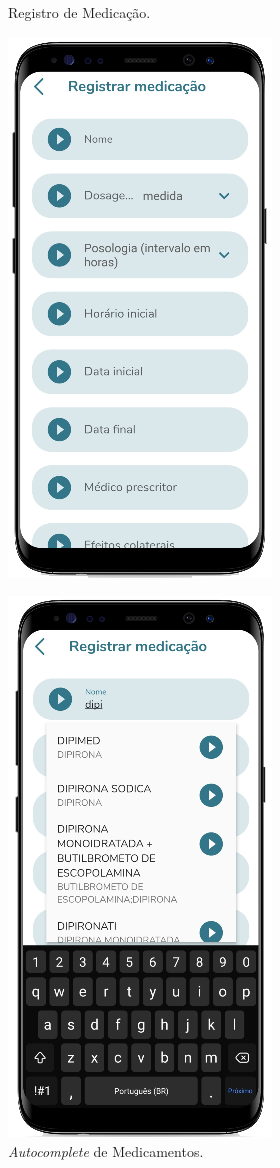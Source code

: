 \begin{figure}[htb]
    \centering
    \begin{minipage}{0.45\textwidth}
        \centering
        \caption{Registro de Medicação.}\label{fig_reg_med}
        \includegraphics[scale=0.66]{Imagens/desenvolvimento/app/reg_med.png}
    \end{minipage}
    \hfill
    \begin{minipage}{0.46\textwidth}
        \centering
        \caption{\emph{Autocomplete} de Medicamentos.}\label{fig_reg_med_auto_comp}
        \includegraphics[scale=0.66]{Imagens/desenvolvimento/app/reg_med_auto_comp.png}

\end{minipage}
\end{figure}
